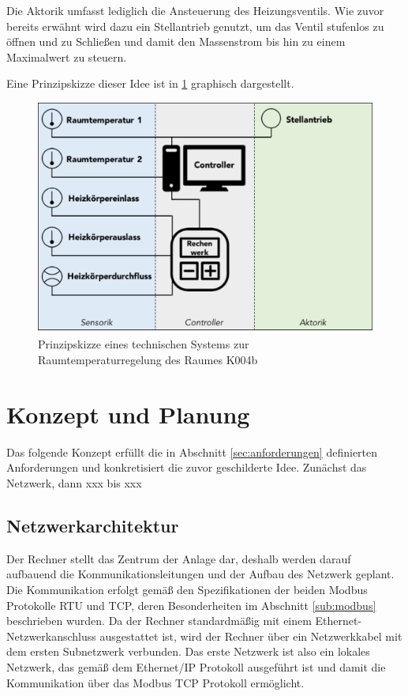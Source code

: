 Die Aktorik umfasst lediglich die Ansteuerung des Heizungsventils. Wie zuvor bereits erwähnt wird dazu ein Stellantrieb genutzt, um das Ventil stufenlos zu öffnen und zu Schließen und damit den Massenstrom bis hin zu einem Maximalwert zu steuern. 

Eine Prinzipskizze dieser Idee ist in \ref{fig:konzept} graphisch dargestellt.

\begin{figure}
\centering
\includegraphics[width=\textwidth]{abbildungen/20160318_Konzept}
\caption{Prinzipskizze eines technischen Systems zur Raumtemperaturregelung des Raumes K004b}
\label{fig:konzept}
\end{figure}

\section{Konzept und Planung}
 
Das folgende Konzept erfüllt die in Abschnitt  \ref{sec:anforderungen} definierten Anforderungen und konkretisiert die zuvor geschilderte Idee. Zunächst das Netzwerk, dann xxx bis xxx

\subsection{Netzwerkarchitektur}

Der Rechner stellt das Zentrum der Anlage dar, deshalb werden darauf aufbauend die Kommunikationsleitungen und der Aufbau des Netzwerk geplant. Die Kommunikation erfolgt gemäß den Spezifikationen der beiden Modbus Protokolle RTU und TCP, deren Besonderheiten im Abschnitt \ref{sub:modbus} beschrieben wurden. Da der Rechner standardmäßig mit einem Ethernet-Netzwerkanschluss ausgestattet ist, wird der Rechner über ein Netzwerkkabel mit dem ersten Subnetzwerk verbunden. Das erste Netzwerk ist also ein lokales Netzwerk, das gemäß dem Ethernet/IP Protokoll ausgeführt ist und damit die Kommunikation über das Modbus TCP Protokoll ermöglicht.

